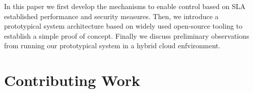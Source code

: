 \documentclass{sig-alternate}
\begin{document}
In this paper we first develop the mechanisms to enable control based on SLA established performance and security measures.  Then, we introduce a prototypical system architecture based on widely used open-source tooling to establish a simple proof of concept.  Finally we discuss preliminary observations from running our prototypical system in a hybrid cloud enfvironment.

\section{Contributing Work}\label{sec:motivation}
%


\end{document}

